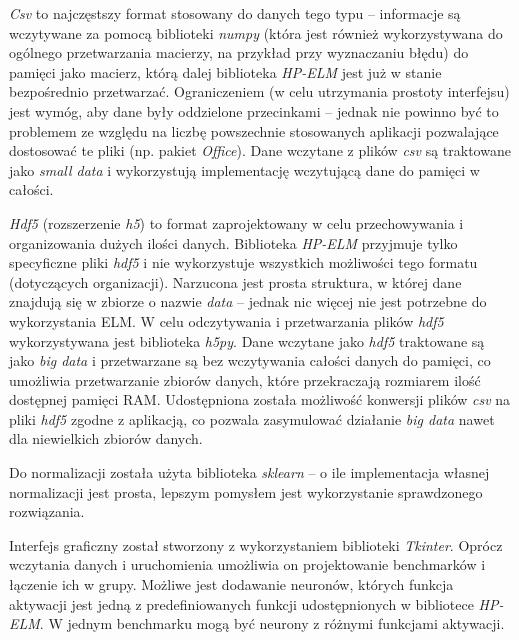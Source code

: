 \documentclass{article}
\begin{document}
\textit{Csv} to najczęstszy format stosowany do danych tego typu -- informacje są wczytywane za pomocą biblioteki \textit{numpy} (która jest również wykorzystywana do ogólnego przetwarzania macierzy, na przykład przy wyznaczaniu błędu) do pamięci jako macierz, którą dalej biblioteka \textit{HP-ELM} jest już w stanie bezpośrednio przetwarzać. Ograniczeniem (w celu utrzymania prostoty interfejsu) jest wymóg, aby dane były oddzielone przecinkami -- jednak nie powinno być to problemem ze względu na liczbę powszechnie stosowanych aplikacji pozwalające dostosować te pliki (np. pakiet \textit{Office}). Dane wczytane z plików \textit{csv} są traktowane jako \textit{small data} i wykorzystują implementację wczytującą dane do pamięci w całości. 

\textit{Hdf5} (rozszerzenie \textit{h5}) to format zaprojektowany w celu przechowywania i organizowania dużych ilości danych. Biblioteka \textit{HP-ELM} przyjmuje tylko specyficzne pliki \textit{hdf5} i nie wykorzystuje wszystkich możliwości tego formatu (dotyczących organizacji). Narzucona jest prosta struktura, w której dane znajdują się w zbiorze o nazwie \textit{data} -- jednak nic więcej nie jest potrzebne do wykorzystania ELM. W celu odczytywania i przetwarzania plików \textit{hdf5} wykorzystywana jest biblioteka \textit{h5py}. Dane wczytane jako \textit{hdf5} traktowane są jako \textit{big data} i przetwarzane są bez wczytywania całości danych do pamięci, co umożliwia przetwarzanie zbiorów danych, które przekraczają rozmiarem ilość dostępnej pamięci RAM. Udostępniona została możliwość konwersji plików \textit{csv} na pliki \textit{hdf5} zgodne z aplikacją, co pozwala zasymulować działanie \textit{big data} nawet dla niewielkich zbiorów danych.  

Do normalizacji została użyta biblioteka \textit{sklearn} -- o ile implementacja własnej normalizacji jest prosta, lepszym pomysłem jest wykorzystanie sprawdzonego rozwiązania.

Interfejs graficzny został stworzony z wykorzystaniem biblioteki \textit{Tkinter}. Oprócz wczytania danych i uruchomienia umożliwia on projektowanie benchmarków i łączenie ich w grupy. Możliwe jest dodawanie neuronów, których funkcja aktywacji jest jedną z predefiniowanych funkcji udostępnionych w bibliotece \textit{HP-ELM}. W jednym benchmarku mogą być neurony z różnymi funkcjami aktywacji. 
\end{document}
